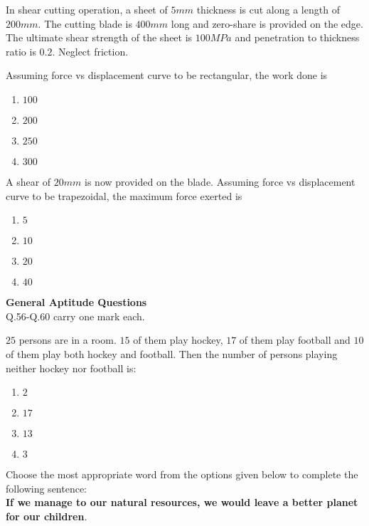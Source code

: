 In shear cutting operation, a sheet of $5mm$ thickness is cut along a length of $200mm$. The cutting blade is $400 mm$ long  and zero-share  is provided on the edge. The ultimate shear strength of the sheet is $100 MPa$ and penetration to thickness ratio is $0.2$. Neglect friction.\\
    \item Assuming force vs displacement curve to be rectangular, the work done  is
    \begin{enumerate}
        \item $100$
        \item $200$
        \item $250$
        \item $300$
    \end{enumerate}
    \item A shear of $20 mm$  is now provided on the blade. Assuming force vs displacement curve to be trapezoidal, the maximum force  exerted is
    \begin{enumerate}
        \item $5$
        \item $10$
        \item $20$
        \item $40$
    \end{enumerate}
    \textbf{General Aptitude  Questions}\\
    Q.56-Q.60 carry one mark each.\\

    \item $25$ persons are in a room. $15$ of them play hockey, $17$ of them play football and $10$ of them play both hockey and football. Then the number of persons playing neither hockey nor football is:
    \begin{enumerate}
    \item $2$
    \item $17$
    \item $13$
    \item $3$
    \end{enumerate}
    \item Choose the most appropriate word from the options given below to complete the following sentence:\\
    \textbf{If we manage to \underline{\hspace{2cm}} our natural resources, we would leave a better planet for our children}.

